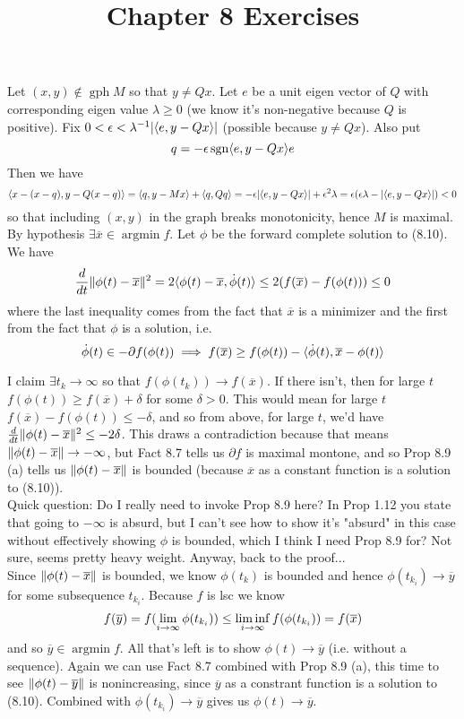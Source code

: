 \documentclass{article}
\title{Chapter 8 Exercises}
\newenvironment{ex}[1]
  {\renewcommand\theexercise{#1}\exercise}
  {\endexercise}
\DeclareMathOperator*{\argmin}{arg min}
\DeclareMathOperator*{\gph}{gph}
\DeclareMathOperator*{\sgn}{sgn}
\newcommand{\xb}{\overline{x}}
\newcommand{\yb}{\overline{y}}
\begin{document}
\begin{ex}{8.5} %
  Let $(x, y) \not\in \gph M$ so that $y \ne Qx$. Let $e$ be a unit eigen vector of $Q$ with corresponding eigen value $\lambda \ge 0$ (we know it's non-negative because $Q$ is positive). Fix $0 < \epsilon < \lambda^{-1} \lvert\langle e, y-Qx\rangle\rvert$ (possible because $y \ne Qx$). Also put
  $$
  q = -\epsilon \sgn \iprod{e}{y - Qx} e
  $$
  Then we have
  $$
  \langle x - (x - q), y - Q(x - q)\rangle = \langle q, y - Mx\rangle + \langle q, Qq\rangle = -\epsilon \lvert\langle e, y - Qx\rangle\rvert + \epsilon^2 \lambda = \epsilon ( \epsilon \lambda - \lvert\langle e, y - Qx\rangle\rvert ) < 0
  $$
  so that including $(x, y)$ in the graph breaks monotonicity, hence $M$ is maximal.
\end{ex} %
\begin{ex}{8.11} %
  By hypothesis $\exists \xb \in \argmin f$. Let $\phi$ be the forward complete solution to (8.10). We have
  $$
  \frac{d}{dt} \norm{\phi(t) - \xb}^2 = 2\iprod{\phi(t) - \xb}{\dot{\phi}(t)} \le 2\parens{f(\xb) - f(\phi(t))} \le 0
  $$
  where the last inequality comes from the fact that $\xb$ is a minimizer and the first from the fact that $\phi$ is a solution, i.e.
  $$
  \dot{\phi}(t) \in -\partial f(\phi(t)) \implies f(\xb) \ge f(\phi(t)) - \iprod{\dot{\phi}(t)}{\xb - \phi(t)}
  $$

  I claim $\exists t_k \to \infty$ so that $f(\phi(t_k)) \to f(\xb)$. If there isn't, then for large $t$ $f(\phi(t)) \ge f(\xb) + \delta$ for some $\delta > 0$. This would mean for large $t$ $f(\xb) - f(\phi(t)) \le -\delta$, and so from above, for large $t$, we'd have $\frac{d}{dt} \norm{\phi(t) - \xb}^2 \le -2\delta$. This draws a contradiction because that means $\norm{\phi(t) - \xb} \to -\infty$, but Fact 8.7 tells us $\partial f$ is maximal montone, and so Prop 8.9 (a) tells us $\norm{\phi(t) - \xb}$ is bounded (because $\xb$ as a constant function is a solution to (8.10)). \, \\

  Quick question: Do I really need to invoke Prop 8.9 here? In Prop 1.12 you state that going to $-\infty$ is absurd, but I can't see how to show it's "absurd" in this case without effectively showing $\phi$ is bounded, which I think I need Prop 8.9 for? Not sure, seems pretty heavy weight. Anyway, back to the proof... \, \\

  Since $\norm{\phi(t) - \xb}$ is bounded, we know $\phi(t_k)$ is bounded and hence $\phi(t_{k_i}) \to \yb$ for some subsequence $t_{k_i}$. Because $f$ is lsc we know
  $$
  f(\yb) = f\parens{\lim_{i \to \infty} \phi(t_{k_i})} \le \liminf_{i \to \infty} f(\phi(t_{k_i})) = f(\xb)
  $$
  and so $\yb \in \argmin f$. All that's left is to show $\phi(t) \to \yb$ (i.e. without a sequence). Again we can use Fact 8.7 combined with Prop 8.9 (a), this time to see $\norm{\phi(t) - \yb}$ is nonincreasing, since $\yb$ as a constrant function is a solution to (8.10). Combined with $\phi(t_{k_i}) \to \yb$ gives us $\phi(t) \to \yb$.
\end{ex} %
\end{document}
